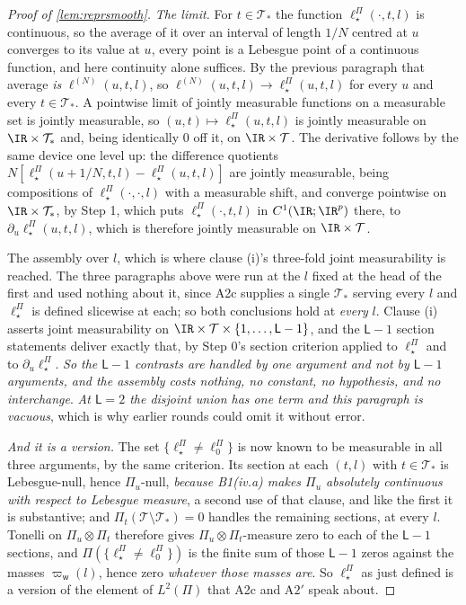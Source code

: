 \begin{proof}[Proof of \cref{lem:reprsmooth}]
\emph{The limit.} For $t\in\mathcal T_\ast$ the function $\ell^\Pi_\star(\cdot,t,l)$ is continuous, so the
average of it over an interval of length $1/N$ centred at $u$ converges to its value at $u$, every
point is a Lebesgue point of a continuous function, and here continuity alone suffices. By the previous
paragraph that average \emph{is} $\ell^{(N)}(u,t,l)$, so
$\ell^{(N)}(u,t,l)\to\ell^\Pi_\star(u,t,l)$ for every $u$ and every $t\in\mathcal T_\ast$. A pointwise limit
of jointly measurable functions on a measurable set is jointly measurable, so
$(u,t)\mapsto\ell^\Pi_\star(u,t,l)$ is jointly
measurable on $\IR\times\mathcal T_\ast$ and, being identically $0$ off it, on $\IR\times\mathcal T$. The
derivative follows by the same device one level up: the difference quotients
$N[\ell^\Pi_\star(u+1/N,t,l)-\ell^\Pi_\star(u,t,l)]$ are jointly measurable, being compositions of
$\ell^\Pi_\star(\cdot,\cdot,l)$ with a measurable shift, and converge pointwise on
$\IR\times\mathcal T_\ast$, by
Step 1, which puts $\ell^\Pi_\star(\cdot,t,l)$ in $C^{1}(\IR;\IR^{p})$ there, to
$\partial_u\ell^\Pi_\star(u,t,l)$, which is therefore jointly measurable on $\IR\times\mathcal T$.

The assembly over $l$, which is where clause \textup{(i)}'s three-fold joint measurability is
reached. The three paragraphs above were run at the $l$ fixed at the head of the first and used nothing
about it, since A2c supplies a single $\mathcal T_\ast$ serving every $l$ and $\ell^\Pi_\star$ is
defined slicewise at each; so both conclusions hold at \emph{every} $l$. Clause \textup{(i)} asserts joint
measurability on $\IR\times\mathcal T\times\{1,\dots,\mathsf L-1\}$, and the $\mathsf L-1$ section
statements deliver exactly that, by Step 0's section criterion applied to $\ell^\Pi_\star$ and to
$\partial_u\ell^\Pi_\star$. \emph{So the $\mathsf L-1$ contrasts are handled by one argument and not by
$\mathsf L-1$ arguments, and the assembly costs nothing, no constant, no hypothesis, and no
interchange}. \emph{At $\mathsf L=2$ the disjoint union has one term and this
paragraph is vacuous}, which is why earlier rounds could omit it without error.

\emph{And it is a version.} The set $\{\ell^\Pi_\star\ne\ell^\Pi_0\}$ is now known to be measurable in
all three arguments, by the same criterion. Its section at each $(t,l)$ with $t\in\mathcal T_\ast$ is
Lebesgue-null, hence $\Pi_u$-null, \emph{because
B1(iv.a) makes $\Pi_u$ absolutely continuous with respect to Lebesgue measure}, a second use of that
clause, and like the first it is substantive; and $\Pi_t(\mathcal T\setminus\mathcal T_\ast)=0$ handles
the remaining sections, at every $l$. Tonelli on $\Pi_u\otimes\Pi_t$ therefore gives
$\Pi_u\otimes\Pi_t$-measure zero to each of the $\mathsf L-1$ sections, and
$\Pi(\{\ell^\Pi_\star\ne\ell^\Pi_0\})$ is the finite sum of those $\mathsf L-1$ zeros against the masses
$\varpi_{\mathsf w}(l)$, hence zero \emph{whatever those masses are}. So $\ell^\Pi_\star$ as
just defined is a version of the element of $L^{2}(\Pi)$ that A2c and A$2'$ speak about.


\end{proof}
